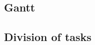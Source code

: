 

\subsection{Gantt}%
\label{sub:gantt}

\subsection{Division of tasks}%
\label{sub:division_of_tasks}

\newcommand*\rot{\rotatebox{90}}
\newcommand*\X{\ding{56}}
\newcommand*\x{\ding{55}}
